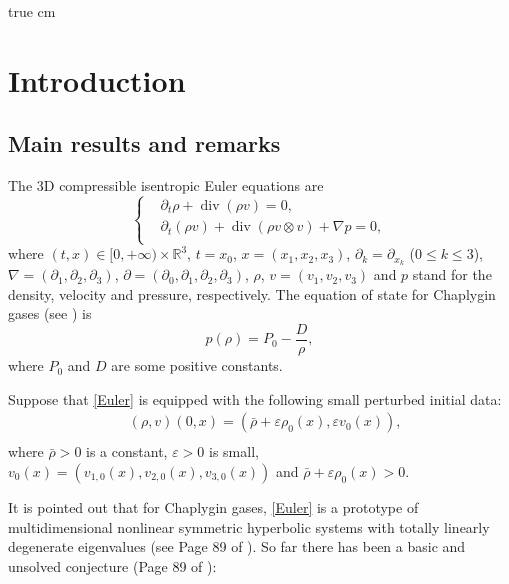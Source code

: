 \documentclass[11pt,twoside]{article}
\def\p{\partial}
\def\ve{\varepsilon}
\DeclareMathOperator{\Div}{div}
\theoremstyle{plain}
\theoremstyle{definition}
\theoremstyle{assumption}
\numberwithin{equation}{section}
\begin{document}
	 true cm
	
	\tableofcontents
	
	
	
	
	
	
	

	
	\section{Introduction}
	
	
	\subsection{Main results and remarks}
	
	
	The 3D compressible isentropic Euler equations are
	\begin{equation}\label{Euler}
		\left\{
		\begin{aligned}
			&\p_t\rho+\Div(\rho v)=0,\\
			&\p_t(\rho v)+\Div(\rho v \otimes v)+\nabla p=0,\\
		\end{aligned}
		\right.
	\end{equation}
	where $(t,x)\in [0,+\infty)\times\mathbb{R}^3$, $t=x_0$, $x=(x_1, x_2, x_3)$, $\p_k=\p_{x_k}$
($0\le k\le 3$), $\nabla=(\p_1,\p_2, \p_3)$, $\p=(\p_0, \p_1, \p_2, \p_3)$, $\rho$, $v=(v_1,v_2,v_3)$ and
	$p$ stand for the density, velocity and  pressure, respectively.
	The equation of state for Chaplygin gases (see \cite{CF}) is
	\begin{equation}\label{pressure2}
		p(\rho)=P_0-\frac{D}{\rho},
	\end{equation}
	where $P_0$ and $D$ are some positive constants.


Suppose that \eqref{Euler} is equipped with the following small perturbed initial data:
\begin{equation}\label{irrot:condition}
\begin{split}
&(\rho,v)(0,x)=(\bar\rho+\ve\rho_0(x),\ve v_0(x)),\\
\end{split}
\end{equation}
where $\bar\rho>0$ is a constant, $\ve>0$ is small, $v_0(x)=(v_{1,0}(x), v_{2,0}(x), v_{3,0}(x))$ and $\bar\rho+\ve\rho_0(x)>0$.

It is pointed out that  for Chaplygin gases, \eqref{Euler} is a prototype of multidimensional nonlinear symmetric hyperbolic
systems with totally linearly degenerate eigenvalues (see  Page 89 of \cite{Majda}). So far there has been
a basic and unsolved conjecture (Page 89 of \cite{Majda}):
\end{document}

